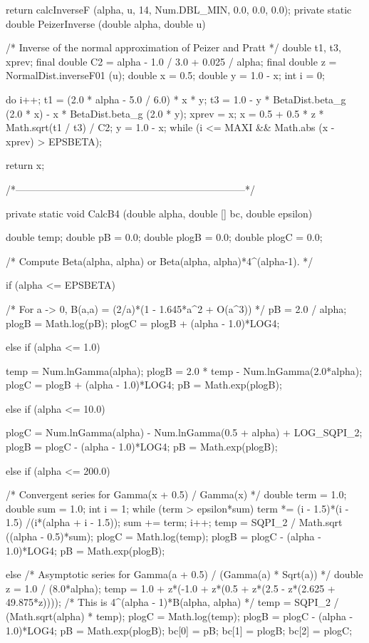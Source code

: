 \begin{code}
\begin{hide} {
      return calcInverseF (alpha, u, 14, Num.DBL_MIN, 0.0, 0.0, 0.0);
   }
   private static double PeizerInverse (double alpha, double u)
   {
      /* Inverse of the normal approximation of Peizer and Pratt */
      double t1, t3, xprev;
      final double C2 = alpha - 1.0 / 3.0 + 0.025 / alpha;
      final double z = NormalDist.inverseF01 (u);
      double x = 0.5;
      double y = 1.0 - x;
      int i = 0;

      do {
         i++;
         t1 = (2.0 * alpha - 5.0 / 6.0) * x * y;
         t3 = 1.0 - y * BetaDist.beta_g (2.0 * x) - x * BetaDist.beta_g (2.0 * y);
         xprev = x;
         x = 0.5 + 0.5 * z * Math.sqrt(t1 / t3) / C2;
         y = 1.0 - x;
      } while (i <= MAXI && Math.abs (x - xprev) > EPSBETA);

      return x;
   }

   /*---------------------------------------------------------------------*/

   private static void CalcB4 (double alpha, double [] bc, double epsilon)
   {
      double temp;
      double pB = 0.0;
      double plogB = 0.0;
      double plogC = 0.0;

      /* Compute Beta(alpha, alpha) or Beta(alpha, alpha)*4^(alpha-1). */

      if (alpha <= EPSBETA) {
         /* For a -> 0, B(a,a) = (2/a)*(1 - 1.645*a^2 + O(a^3)) */
         pB = 2.0 / alpha;
	      plogB = Math.log(pB);
         plogC = plogB + (alpha - 1.0)*LOG4;

      } else if (alpha <= 1.0) {
         temp = Num.lnGamma(alpha);
	      plogB = 2.0 * temp - Num.lnGamma(2.0*alpha);
         plogC = plogB + (alpha - 1.0)*LOG4;
         pB = Math.exp(plogB);

      } else if (alpha <= 10.0) {
         plogC = Num.lnGamma(alpha) - Num.lnGamma(0.5 + alpha) + LOG_SQPI_2;
         plogB = plogC - (alpha - 1.0)*LOG4;
         pB = Math.exp(plogB);

      } else if (alpha <= 200.0) {
         /* Convergent series for Gamma(x + 0.5) / Gamma(x) */
         double term = 1.0;
         double sum = 1.0;
         int i = 1;
         while (term > epsilon*sum) {
            term *= (i - 1.5)*(i - 1.5) /(i*(alpha + i - 1.5));
            sum += term;
            i++;
         }
         temp = SQPI_2 / Math.sqrt ((alpha - 0.5)*sum);
         plogC = Math.log(temp);
         plogB = plogC - (alpha - 1.0)*LOG4;
         pB = Math.exp(plogB);

      } else {
         /* Asymptotic series for Gamma(a + 0.5) / (Gamma(a) * Sqrt(a)) */
         double z = 1.0 / (8.0*alpha);
         temp = 1.0 + z*(-1.0 + z*(0.5 + z*(2.5 - z*(2.625 + 49.875*z))));
         /* This is 4^(alpha - 1)*B(alpha, alpha) */
         temp = SQPI_2 / (Math.sqrt(alpha) * temp);
         plogC = Math.log(temp);
         plogB = plogC - (alpha - 1.0)*LOG4;
         pB = Math.exp(plogB);
      }
      bc[0] = pB;
      bc[1] = plogB;
      bc[2] = plogC;
   }


\end{hide}
\end{code}
